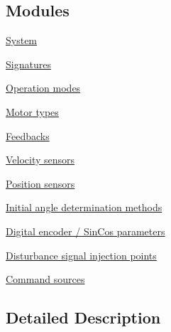\subsection*{Modules}
\begin{DoxyCompactItemize}
\item 
\hyperlink{group__IL__CONST__SYS}{System}
\item 
\hyperlink{group__IL__CONST__SIGNATURES}{Signatures}
\item 
\hyperlink{group__IL__CONST__OP__MODE}{Operation modes}
\item 
\hyperlink{group__IL__CONST__MOTOR}{Motor types}
\item 
\hyperlink{group__IL__CONST__FB}{Feedbacks}
\item 
\hyperlink{group__IL__CONST__VEL__SENSOR}{Velocity sensors}
\item 
\hyperlink{group__IL__CONST__POS__SENSOR}{Position sensors}
\item 
\hyperlink{group__IL__CONST__IANGLE__METHOD}{Initial angle determination methods}
\item 
\hyperlink{group__IL__CONST__DENC__SINCOS__PARAM}{Digital encoder / Sin\+Cos parameters}
\item 
\hyperlink{group__IL__CONST__DSIG__INJ}{Disturbance signal injection points}
\item 
\hyperlink{group__IL__CONST__CMD__SRC}{Command sources}
\end{DoxyCompactItemize}


\subsection{Detailed Description}

